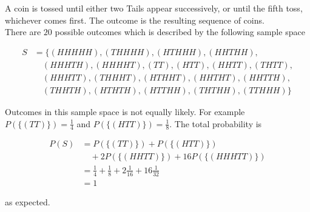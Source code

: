 \documentclass[12pt, a4paper]{article}
\newcounter{exa}
\begin{document}
\begin{texample}
A coin is tossed until either two Tails appear successively, or until the fifth toss, whichever comes first. The outcome is the resulting sequence of coins. \\

There are $20$ possible outcomes which is described by the following sample space

\begin{align*}
S&=\{(HHHHH), (THHHH), (HTHHH), (HHTHH), \\
&\quad (HHHTH), (HHHHT), (TT), (HTT), (HHTT), (THTT), \\
&\quad (HHHTT), (THHHT), (HTHHT), (HHTHT), (HHTTH), \\
&\quad (THHTH), (HTHTH), (HTTHH), (THTHH), (TTHHH)\}
\end{align*}

Outcomes in this sample space is not equally likely. For example $P(\{(TT)\})=\frac{1}{4}$ and $P(\{(HTT)\})=\frac{1}{8}$. The total probability is

\begin{align*}
P(S)&=P(\{(TT)\})+P(\{(HTT)\}) \\
&\quad+2 P(\{(HHTT)\})+16  P(\{(HHHTT)\}) \\
&=\frac{1}{4}+\frac{1}{8}+2\frac{1}{16}+16\frac{1}{32} \\
&=1
\end{align*}

as expected.
\end{texample}
\end{document}
